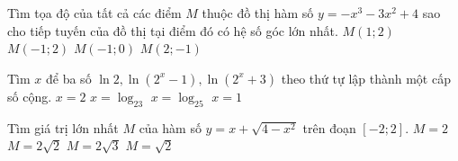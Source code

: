 \begin{ex}%
	Tìm tọa độ của tất cả các điểm $M$ thuộc đồ thị hàm số $y=-x^3-3x^2+4$ sao cho tiếp tuyến của đồ thị tại điểm đó có hệ số góc lớn nhất.
	\choice
	{$M(1;2)$}
	{\True $M(-1;2)$}
	{$M(-1;0)$}
	{$M(2;-1)$}
\end{ex}

\begin{ex}%
	Tìm $x$ để ba số $\ln2, \ln\left(2^x-1\right), \ln\left(2^x+3\right)$ theo thứ tự lập thành một cấp số cộng.
	\choice
	{$x=2$}
	{$x=\log_23$}
	{\True $x=\log_25$}
	{$x=1$}
\end{ex}

\begin{ex}%
	Tìm giá trị lớn nhất $M$ của hàm số $y=x+\sqrt{4-x^2}$ trên đoạn $[-2;2]$.
	\choice
	{$M=2$}
	{\True $M=2\sqrt{2}$}
	{$M=2\sqrt{3}$}
	{$M=\sqrt{2}$}
\end{ex}

